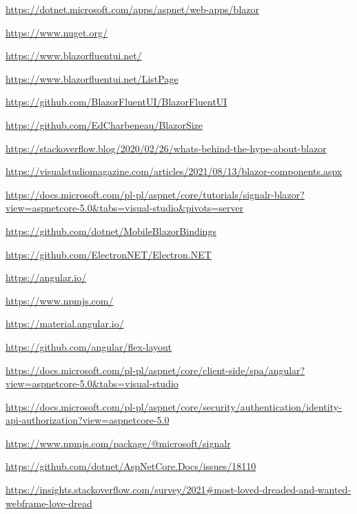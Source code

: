 \documentclass[12pt,a4paper,oneside]{book}
\begin{document}
\begin{thebibliography}{99}
\url{https://dotnet.microsoft.com/apps/aspnet/web-apps/blazor}

\url{https://www.nuget.org/}

\url{https://www.blazorfluentui.net/}

\url{https://www.blazorfluentui.net/ListPage}

\url{https://github.com/BlazorFluentUI/BlazorFluentUI}

\url{https://github.com/EdCharbeneau/BlazorSize}

\url{https://stackoverflow.blog/2020/02/26/whats-behind-the-hype-about-blazor}

\url{https://visualstudiomagazine.com/articles/2021/08/13/blazor-components.aspx}

\url{https://docs.microsoft.com/pl-pl/aspnet/core/tutorials/signalr-blazor?view=aspnetcore-5.0&tabs=visual-studio&pivots=server}

\url{https://github.com/dotnet/MobileBlazorBindings}

\url{https://github.com/ElectronNET/Electron.NET}

\url{https://angular.io/}

\url{https://www.npmjs.com/}

\url{https://material.angular.io/}

\url{https://github.com/angular/flex-layout}

\url{https://docs.microsoft.com/pl-pl/aspnet/core/client-side/spa/angular?view=aspnetcore-5.0&tabs=visual-studio}

\url{https://docs.microsoft.com/pl-pl/aspnet/core/security/authentication/identity-api-authorization?view=aspnetcore-5.0}

\url{https://www.npmjs.com/package/@microsoft/signalr}

\url{https://github.com/dotnet/AspNetCore.Docs/issues/18110}

\url{https://insights.stackoverflow.com/survey/2021#most-loved-dreaded-and-wanted-webframe-love-dread}


\end{thebibliography} 
\end{document}
